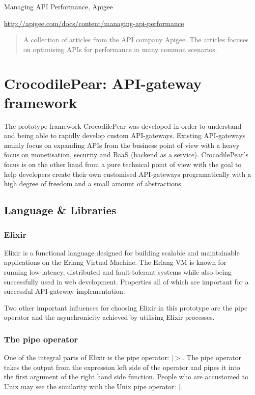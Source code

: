 \documentclass{cslthse-msc}
\begin{document}
\vspace{5mm}

\noindent Managing API Performance, Apigee

\noindent \url{http://apigee.com/docs/content/managing-api-performance}

\begin{quote}
	A collection of articles from the API company Apigee. The articles focuses on optimising APIs for performance in many common scenarios.
\end{quote}

\chapter{CrocodilePear: API-gateway framework}

The prototype framework CrocodilePear was developed in order to understand and being able to rapidly develop custom API-gateways. Existing API-gateways mainly focus on expanding APIs from the business point of view with a heavy focus on monetisation, security and BaaS (backend as a service). CrocodilePear's focus is on the other hand from a pure technical point of view with the goal to help developers create their own customised API-gateways programatically with a high degree of freedom and a small amount of abstractions.

\section{Language \& Libraries}
\subsection{Elixir}
Elixir is a functional language designed for building scalable and maintainable applications on the Erlang Virtual Machine. The Erlang VM is known for running low-latency, distributed and fault-tolerant systems while also being successfully used in web development\cite{elixir}. Properties all of which are important for a successful API-gateway implementation.

Two other important influences for choosing Elixir in this prototype are the pipe operator and the asynchronicity achieved by utilising Elixir processes.

\subsection{The pipe operator}
One of the integral parts of Elixir is the pipe operator: $|>$. The pipe operator takes the output from the expression left side of the operator and pipes it into the first argument of the right hand side function. People who are accustomed to Unix may see the similarity with the Unix pipe operator: $|$.
\end{document}
